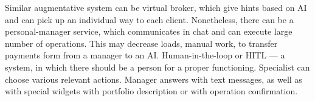 Similar augmentative system can be virtual broker, which give hints based on AI and can pick up an individual way to each client.
Nonetheless, there can be a personal-manager service, which communicates in chat and can execute large number of operations.
This may decrease loads, manual work, to transfer payments form from a manager to an AI.
Human-in-the-loop or HITL — a system, in which there should be a person for a proper functioning.
Specialist can choose various relevant actions.
Manager answers with text messages, as well as with special widgets with portfolio description or with operation confirmation. 
